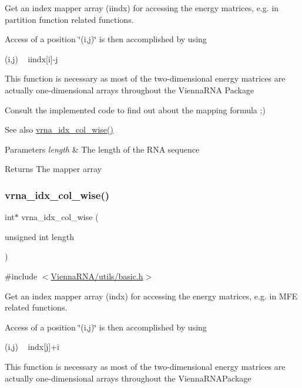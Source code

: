 Get an index mapper array (iindx) for accessing the energy matrices, e.\+g. in partition function related functions. 

Access of a position \char`\"{}(i,j)\char`\"{} is then accomplished by using\begin{DoxyVerb}(i,j) ~ iindx[i]-j \end{DoxyVerb}
 This function is necessary as most of the two-\/dimensional energy matrices are actually one-\/dimensional arrays throughout the Vienna\+R\+NA Package

Consult the implemented code to find out about the mapping formula ;)

\begin{DoxySeeAlso}{See also}
\hyperlink{group__utils_ga89ebc69c52fa0c78c9e1974b0017746b}{vrna\+\_\+idx\+\_\+col\+\_\+wise()} 
\end{DoxySeeAlso}

\begin{DoxyParams}{Parameters}
{\em length} & The length of the R\+NA sequence \\
\hline
\end{DoxyParams}
\begin{DoxyReturn}{Returns}
The mapper array 
\end{DoxyReturn}
\mbox{\label{group__utils_ga89ebc69c52fa0c78c9e1974b0017746b}} 
\subsubsection{\texorpdfstring{vrna\+\_\+idx\+\_\+col\+\_\+wise()}{vrna\_idx\_col\_wise()}}
{\footnotesize\ttfamily int$\ast$ vrna\+\_\+idx\+\_\+col\+\_\+wise (\begin{DoxyParamCaption}\item[{unsigned int}]{length }\end{DoxyParamCaption})}



{\ttfamily \#include $<$\hyperlink{utils_2basic_8h}{Vienna\+R\+N\+A/utils/basic.\+h}$>$}



Get an index mapper array (indx) for accessing the energy matrices, e.\+g. in M\+FE related functions. 

Access of a position \char`\"{}(i,j)\char`\"{} is then accomplished by using\begin{DoxyVerb}(i,j) ~ indx[j]+i \end{DoxyVerb}
 This function is necessary as most of the two-\/dimensional energy matrices are actually one-\/dimensional arrays throughout the Vienna\+R\+N\+A\+Package

